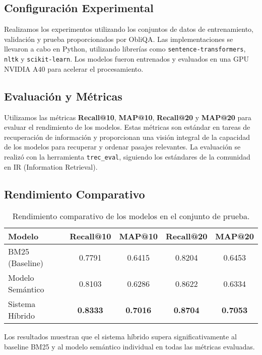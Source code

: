 \documentclass[11pt,english]{article}
\theoremstyle{plain}
\begin{document}
\subsection{Configuración Experimental}

Realizamos los experimentos utilizando los conjuntos de datos de entrenamiento, validación y prueba proporcionados por ObliQA. Las implementaciones se llevaron a cabo en Python, utilizando librerías como \texttt{sentence-transformers}, \texttt{nltk} y \texttt{scikit-learn}. Los modelos fueron entrenados y evaluados en una GPU NVIDIA A40 para acelerar el procesamiento.

\subsection{Evaluación y Métricas}

Utilizamos las métricas \textbf{Recall@10}, \textbf{MAP@10}, \textbf{Recall@20} y \textbf{MAP@20} para evaluar el rendimiento de los modelos. Estas métricas son estándar en tareas de recuperación de información y proporcionan una visión integral de la capacidad de los modelos para recuperar y ordenar pasajes relevantes. La evaluación se realizó con la herramienta \texttt{trec\_eval}, siguiendo los estándares de la comunidad en IR (Information Retrieval).

\subsection{Rendimiento Comparativo}

\begin{table}[h!]
\centering
\begin{tabular}{|l|c|c|c|c|}
\hline
\textbf{Modelo} & \textbf{Recall@10} & \textbf{MAP@10} & \textbf{Recall@20} & \textbf{MAP@20} \\ \hline
BM25 (Baseline) & 0.7791 & 0.6415 & 0.8204 & 0.6453 \\ \hline
Modelo Semántico     & 0.8103 & 0.6286 & 0.8622 & 0.6334 \\ \hline
Sistema Híbrido         & \textbf{0.8333} & \textbf{0.7016} & \textbf{0.8704} & \textbf{0.7053} \\ \hline
\end{tabular}
\caption{Rendimiento comparativo de los modelos en el conjunto de prueba.}
\end{table}

\noindent Los resultados muestran que el sistema híbrido supera significativamente al baseline BM25 y al modelo semántico individual en todas las métricas evaluadas.
\end{document}
